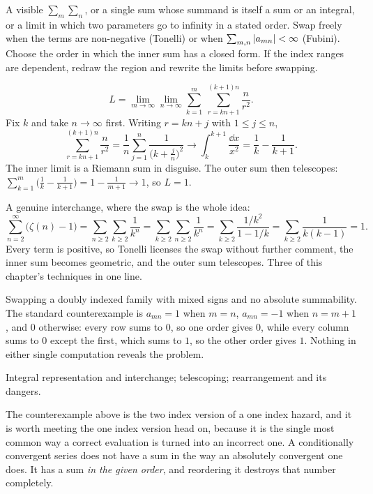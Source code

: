 \cue A visible $\sum_m\sum_n$, or a single sum whose summand is itself a sum or an integral, or a limit in which two parameters go to infinity in a stated order.
\method Swap freely when the terms are non-negative (Tonelli) or when $\sum_{m,n}\left\lvert a_{mn}\right\rvert<\infty$ (Fubini). Choose the order in which the inner sum has a closed form. If the index ranges are dependent, redraw the region and rewrite the limits before swapping.

\begin{worked}
\[L=\lim_{m\to\infty}\lim_{n\to\infty}\sum_{k=1}^{m}\ \sum_{r=kn+1}^{(k+1)n}\frac{n}{r^{2}}.\]
Fix $k$ and take $n\to\infty$ first. Writing $r=kn+j$ with $1\leq j\leq n$,
\[\sum_{r=kn+1}^{(k+1)n}\frac{n}{r^{2}}=\frac1n\sum_{j=1}^{n}\frac{1}{\bigl(k+\tfrac jn\bigr)^{2}}\longrightarrow\int_{k}^{k+1}\frac{\dd x}{x^{2}}=\frac1k-\frac{1}{k+1}.\]
The inner limit is a Riemann sum in disguise. The outer sum then telescopes: $\sum_{k=1}^{m}\bigl(\tfrac1k-\tfrac1{k+1}\bigr)=1-\tfrac1{m+1}\to1$, so $L=1$.
\end{worked}
A genuine interchange, where the swap is the whole idea:
\[\sum_{n=2}^{\infty}\bigl(\zeta(n)-1\bigr)=\sum_{n\geq2}\sum_{k\geq2}\frac{1}{k^{n}}=\sum_{k\geq2}\sum_{n\geq2}\frac{1}{k^{n}}=\sum_{k\geq2}\frac{1/k^{2}}{1-1/k}=\sum_{k\geq2}\frac{1}{k(k-1)}=1.\]
Every term is positive, so Tonelli licenses the swap without further comment, the inner sum becomes geometric, and the outer sum telescopes. Three of this chapter's techniques in one line.

\begin{trap}
Swapping a doubly indexed family with mixed signs and no absolute summability. The standard counterexample is $a_{mn}=1$ when $m=n$, $a_{mn}=-1$ when $n=m+1$, and $0$ otherwise: every row sums to $0$, so one order gives $0$, while every column sums to $0$ except the first, which sums to $1$, so the other order gives $1$. Nothing in either single computation reveals the problem.
\end{trap}

\begin{seealsob}Integral representation and interchange; telescoping; rearrangement and its dangers.\end{seealsob}

The counterexample above is the two index version of a one index hazard, and it is worth meeting the one index version head on, because it is the single most common way a correct evaluation is turned into an incorrect one. A conditionally convergent series does not have a sum in the way an absolutely convergent one does. It has a sum \emph{in the given order}, and reordering it destroys that number completely.

